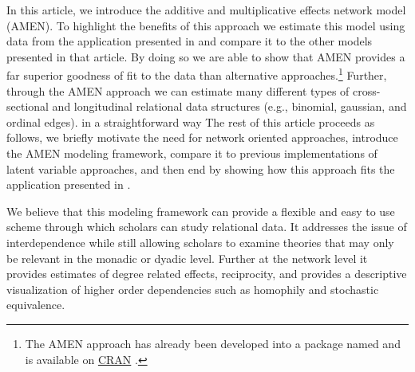 In this article, we introduce the additive and multiplicative effects network model (AMEN). To highlight the benefits of this approach we estimate this model using data from  the application presented in \citet{cranmer:etal:2016} and compare it to the other models presented in that article. By doing so we are able to show that AMEN provides a far superior goodness of fit to the data than alternative approaches.\footnote{The AMEN approach has already been developed into a package named  and is available on \href{https://cran.r-project.org/web/packages/amen/index.html}{CRAN} \citep{hoff:etal:2015}.} Further, through the AMEN approach we can estimate many different types of cross-sectional and longitudinal relational data structures (e.g., binomial, gaussian, and ordinal edges). in a straightforward way The rest of this article proceeds as follows, we briefly motivate the need for network oriented approaches, introduce the AMEN modeling framework, compare it to previous implementations of latent variable approaches, and then end by showing how this approach fits the application presented in \citet{cranmer:etal:2016}. 

We believe that this modeling framework can provide a flexible and easy to use scheme through which scholars can study relational data. It addresses the issue of interdependence while still allowing scholars to examine theories that may only be relevant in the monadic or dyadic level. Further at the network level it provides estimates of degree related effects, reciprocity, and provides a descriptive visualization of higher order dependencies such as homophily and stochastic equivalence. 




